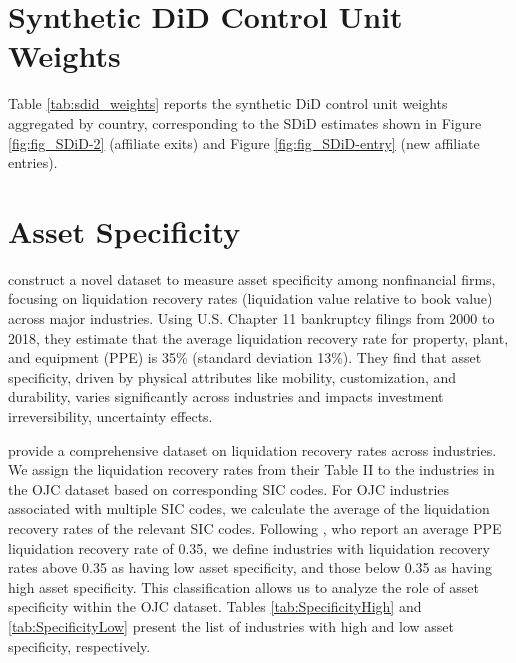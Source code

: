 \documentclass[preprint,11pt,authoryear]{elsarticle}
\begin{document}
\clearpage
\section{Synthetic DiD Control Unit Weights}\label{sec:sdid_weights}

Table \ref{tab:sdid_weights} reports the synthetic DiD control unit weights aggregated by country, corresponding to the SDiD estimates shown in Figure \ref{fig:fig_SDiD-2} (affiliate exits) and Figure \ref{fig:fig_SDiD-entry} (new affiliate entries).


{\renewcommand\normalsize{\scriptsize}%
\normalsize 

}




\clearpage
\section{Asset Specificity}\label{sec:asset}

\cite{kermani2023asset} construct a novel dataset to measure asset specificity among nonfinancial firms, focusing on liquidation recovery rates (liquidation value relative to book value) across major industries. Using U.S. Chapter 11 bankruptcy filings from 2000 to 2018, they estimate that the average liquidation recovery rate for property, plant, and equipment (PPE) is 35\% (standard deviation 13\%).
They find that asset specificity, driven by physical attributes like mobility, customization, and durability, varies significantly across industries and impacts investment irreversibility, uncertainty effects.

\cite{kermani2023asset} provide a comprehensive dataset on liquidation recovery rates across industries. 
We assign the liquidation recovery rates from their Table II to the industries in the OJC dataset based on corresponding SIC codes. For OJC industries associated with multiple SIC codes, we calculate the average of the liquidation recovery rates of the relevant SIC codes. Following \cite{kermani2023asset}, who report an average PPE liquidation recovery rate of 0.35, we define industries with liquidation recovery rates above 0.35 as having low asset specificity, and those below 0.35 as having high asset specificity. This classification allows us to analyze the role of asset specificity within the OJC dataset.
Tables \ref{tab:SpecificityHigh} and \ref{tab:SpecificityLow} present the list of industries with high and low asset specificity, respectively.
\end{document}

